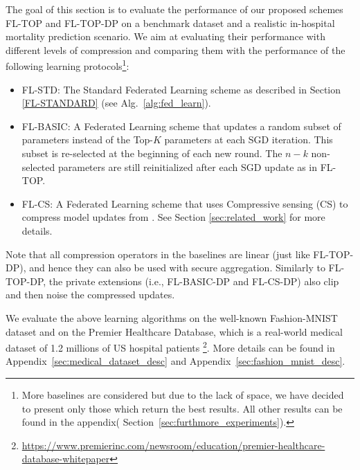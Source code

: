 \documentclass[accepted]{uai2021} %
\newcommand{\TOPK}{Top-$K$\xspace}
\begin{document}
The goal of this section is to evaluate the performance of our proposed schemes FL-TOP and FL-TOP-DP on a benchmark dataset and a realistic in-hospital mortality prediction scenario. We aim at evaluating their performance with different levels of compression and comparing them with the performance of the following learning protocols\footnote{More baselines are considered but due to the lack of space, we have decided to present only those which return the best results. All other results can be found in the appendix( Section~\ref{sec:furthmore_experiments}).}:
\begin{itemize}
    \item FL-STD: The Standard Federated Learning scheme as described in Section \ref{FL-STANDARD} (see Alg.~\ref{alg:fed_learn}). %
    \item FL-BASIC: A Federated Learning scheme that updates a random subset of parameters instead of the \TOPK parameters at each SGD iteration. This subset is re-selected at the beginning of each new round.
    The $n-k$ non-selected parameters are still reinitialized after each SGD update as in FL-TOP. 
    \item FL-CS: A Federated Learning scheme that uses Compressive sensing (CS) to compress model updates from \cite{our_cs}. See Section \ref{sec:related_work} for more details.
\end{itemize}

Note that all compression operators in the baselines are linear (just like FL-TOP-DP), and hence they can also be used with secure aggregation. Similarly to FL-TOP-DP, the private extensions (i.e., FL-BASIC-DP and FL-CS-DP) also clip and then noise the compressed updates. 

We evaluate the above learning algorithms on the well-known Fashion-MNIST dataset \citep{Fashion-MNIST} and on the Premier Healthcare Database, which is  a real-world medical dataset of 1.2 millions of US hospital patients \footnote{\href{https://www.premierinc.com/newsroom/education/premier-healthcare-database-whitepaper}{https://www.premierinc.com/newsroom/education/premier-healthcare-database-whitepaper}}. More details can be found in Appendix~\ref{sec:medical_dataset_desc} and Appendix~\ref{sec:fashion_mnist_desc}.
\end{document}

